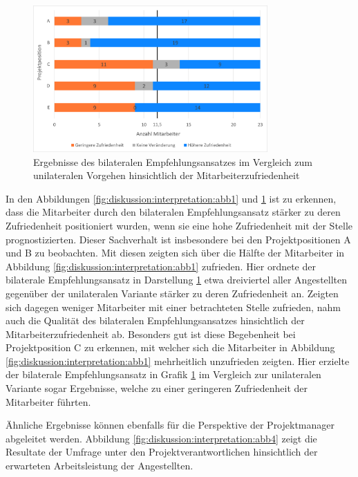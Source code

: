 \begin{figure}[h]
	\centering
	\includegraphics[width=0.8\textwidth]{gfx/zufriedenheit-projekte.png}	
	\caption{Ergebnisse des bilateralen Empfehlungsansatzes im Vergleich zum unilateralen Vorgehen hinsichtlich der Mitarbeiterzufriedenheit}
	\label{fig:diskussion:interpretation:abb3}
\end{figure}

In den Abbildungen \ref{fig:diskussion:interpretation:abb1} und \ref{fig:diskussion:interpretation:abb3} ist zu erkennen, dass die Mitarbeiter durch den bilateralen Empfehlungsansatz stärker zu deren Zufriedenheit positioniert wurden, wenn sie eine hohe Zufriedenheit mit der Stelle prognostizierten. Dieser Sachverhalt ist insbesondere bei den Projektpositionen A und B zu beobachten. Mit diesen zeigten sich über die Hälfte der Mitarbeiter in Abbildung \ref{fig:diskussion:interpretation:abb1} zufrieden. Hier ordnete der bilaterale Empfehlungsansatz in Darstellung \ref{fig:diskussion:interpretation:abb3} etwa dreiviertel aller Angestellten gegenüber der unilateralen Variante stärker zu deren Zufriedenheit an. Zeigten sich dagegen weniger Mitarbeiter mit einer betrachteten Stelle zufrieden, nahm auch die Qualität des bilateralen Empfehlungsansatzes hinsichtlich der Mitarbeiterzufriedenheit ab. Besonders gut ist diese Begebenheit bei Projektposition C zu erkennen, mit welcher sich die Mitarbeiter in Abbildung \ref{fig:diskussion:interpretation:abb1} mehrheitlich unzufrieden zeigten. Hier erzielte der bilaterale Empfehlungsansatz in Grafik \ref{fig:diskussion:interpretation:abb3} im Vergleich zur unilateralen Variante sogar Ergebnisse, welche zu einer geringeren Zufriedenheit der Mitarbeiter führten.

Ähnliche Ergebnisse können ebenfalls für die Perspektive der Projektmanager abgeleitet werden. Abbildung \ref{fig:diskussion:interpretation:abb4} zeigt die Resultate der Umfrage unter den Projektverantwortlichen hinsichtlich der erwarteten Arbeitsleistung der Angestellten.

